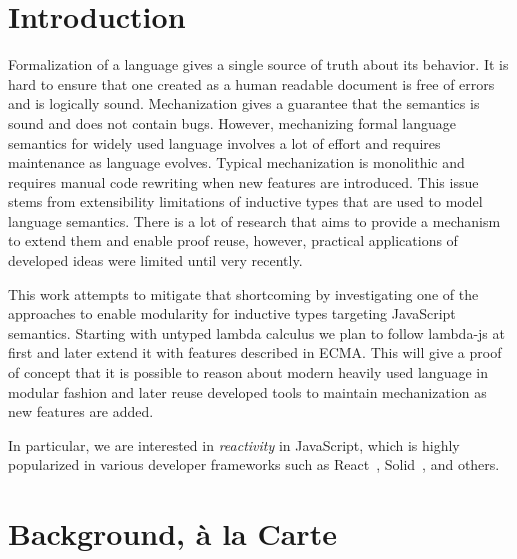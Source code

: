 \documentclass[sigplan,nonacm]{acmart}
\begin{document}


\maketitle

\section{Introduction}

Formalization of a language gives a single source of truth about its behavior. It is hard to ensure that one created as a human readable document is free of errors and is logically sound. Mechanization gives a guarantee that the semantics is sound and does not contain bugs. However, mechanizing formal language semantics for widely used language involves a lot of effort and requires maintenance as language evolves. Typical mechanization is monolithic\cite{??} and requires manual code rewriting when new features are introduced. This issue stems from extensibility limitations\cite{??} of inductive types that are used to model language semantics. There is a lot of research\cite{jin2023extensible, vistrup2025program, van2022intrinsically} that aims to provide a mechanism to extend them and enable proof reuse, however, practical applications of developed ideas were limited until very recently\cite{ebresafe2025certified}. 

This work attempts to mitigate that shortcoming by investigating one\cite{forster2020coq} of the approaches to enable modularity for inductive types targeting JavaScript semantics\cite{ECMA}. Starting with untyped lambda calculus we plan to follow lambda-js\cite{guha2010essence} at first and later extend it with features described in ECMA. This will give a proof of concept that it is possible to reason about modern heavily used language in modular fashion and later reuse developed tools to maintain mechanization as new features are added. 

In particular,
we are interested in \emph{reactivity} in JavaScript,
which is highly popularized in various developer frameworks
such as React~\cite{React}, Solid~\cite{Solid}, and others.

\section{Background, à la Carte}
\end{document}
